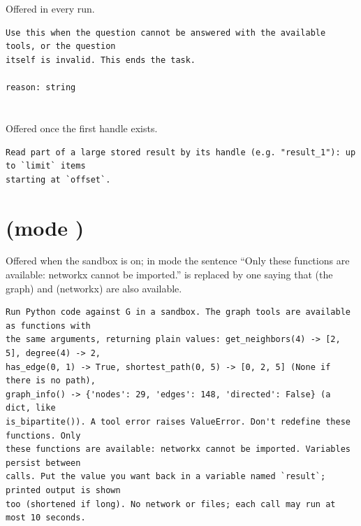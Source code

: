 \section*{}
Offered in every run.
\begin{lstlisting}
Use this when the question cannot be answered with the available tools, or the question
itself is invalid. This ends the task.

reason: string
\end{lstlisting}

\section*{}
Offered once the first handle exists.
\begin{lstlisting}
Read part of a large stored result by its handle (e.g. "result_1"): up to `limit` items
starting at `offset`.
\end{lstlisting}

\section*{ (mode )}
Offered when the sandbox is on; in mode  the sentence ``Only these functions are available: networkx cannot be imported.'' is replaced by one saying that  (the graph) and  (networkx) are also available.
\begin{lstlisting}
Run Python code against G in a sandbox. The graph tools are available as functions with
the same arguments, returning plain values: get_neighbors(4) -> [2, 5], degree(4) -> 2,
has_edge(0, 1) -> True, shortest_path(0, 5) -> [0, 2, 5] (None if there is no path),
graph_info() -> {'nodes': 29, 'edges': 148, 'directed': False} (a dict, like
is_bipartite()). A tool error raises ValueError. Don't redefine these functions. Only
these functions are available: networkx cannot be imported. Variables persist between
calls. Put the value you want back in a variable named `result`; printed output is shown
too (shortened if long). No network or files; each call may run at most 10 seconds.
\end{lstlisting}
